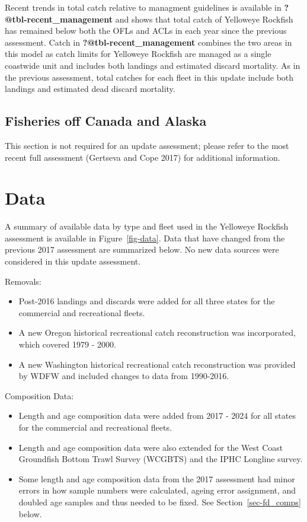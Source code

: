 \documentclass[
]{scrartcl}
\providecommand{\tightlist}{%
  \setlength{\itemsep}{0pt}\setlength{\parskip}{0pt}}\usepackage{longtable,booktabs,array}
\begin{document}
Recent trends in total catch relative to managment guidelines is
available in \textbf{?@tbl-recent\_management} and shows that total
catch of Yelloweye Rockfish has remained below both the OFLs and ACLs in
each year since the previous assessment. Catch in
\textbf{?@tbl-recent\_management} combines the two areas in this model
as catch limits for Yelloweye Rockfish are managed as a single coastwide
unit and includes both landings and estimated discard mortality. As in
the previous assessment, total catches for each fleet in this update
include both landings and estimated dead discard mortality.

\subsection{Fisheries off Canada and
Alaska}\label{fisheries-off-canada-and-alaska}

This section is not required for an update assessment; please refer to
the most recent full assessment (Gertseva and Cope 2017) for additional
information.

\newpage{}

\section{Data}\label{data}

A summary of available data by type and fleet used in the Yelloweye
Rockfish assessment is available in Figure~\ref{fig-data}. Data that
have changed from the previous 2017 assessment are summarized below. No
new data sources were considered in this update assessment.

Removals:

\begin{itemize}
\tightlist
\item
  Post-2016 landings and discards were added for all three states for
  the commercial and recreational fleets.
\item
  A new Oregon historical recreational catch reconstruction was
  incorporated, which covered 1979 - 2000.
\item
  A new Washington historical recreational catch reconstruction was
  provided by WDFW and included changes to data from 1990-2016.
\end{itemize}

Composition Data:

\begin{itemize}
\tightlist
\item
  Length and age composition data were added from 2017 - 2024 for all
  states for the commercial and recreational fleets.
\item
  Length and age composition data were also extended for the West Coast
  Groundfish Bottom Trawl Survey (WCGBTS) and the IPHC Longline survey.
\item
  Some length and age composition data from the 2017 assessment had
  minor errors in how sample numbers were calculated, ageing error
  assignment, and doubled age samples and thus needed to be fixed. See
  Section~\ref{sec-fd_comps} below.
\end{itemize}
\end{document}
